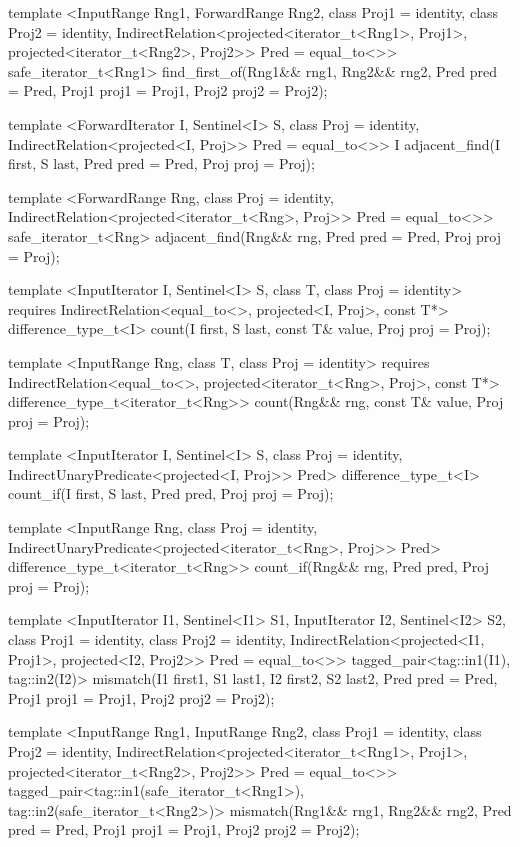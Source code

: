 {\begin{codeblock}
{{    template <InputRange Rng1, ForwardRange Rng2, class Proj1 = identity,
        class Proj2 = identity,
        IndirectRelation<projected<iterator_t<Rng1>, Proj1>,
          projected<iterator_t<Rng2>, Proj2>> Pred = equal_to<>>
      safe_iterator_t<Rng1>
        find_first_of(Rng1&& rng1, Rng2&& rng2,
                      Pred pred = Pred{},
                      Proj1 proj1 = Proj1{}, Proj2 proj2 = Proj2{});

    template <ForwardIterator I, Sentinel<I> S, class Proj = identity,
        IndirectRelation<projected<I, Proj>> Pred = equal_to<>>
      I adjacent_find(I first, S last, Pred pred = Pred{},
                      Proj proj = Proj{});

    template <ForwardRange Rng, class Proj = identity,
        IndirectRelation<projected<iterator_t<Rng>, Proj>> Pred = equal_to<>>
      safe_iterator_t<Rng>
        adjacent_find(Rng&& rng, Pred pred = Pred{}, Proj proj = Proj{});

    template <InputIterator I, Sentinel<I> S, class T, class Proj = identity>
      requires IndirectRelation<equal_to<>, projected<I, Proj>, const T*>
      difference_type_t<I>
        count(I first, S last, const T& value, Proj proj = Proj{});

    template <InputRange Rng, class T, class Proj = identity>
      requires IndirectRelation<equal_to<>, projected<iterator_t<Rng>, Proj>, const T*>
      difference_type_t<iterator_t<Rng>>
        count(Rng&& rng, const T& value, Proj proj = Proj{});

    template <InputIterator I, Sentinel<I> S, class Proj = identity,
        IndirectUnaryPredicate<projected<I, Proj>> Pred>
      difference_type_t<I>
        count_if(I first, S last, Pred pred, Proj proj = Proj{});

    template <InputRange Rng, class Proj = identity,
        IndirectUnaryPredicate<projected<iterator_t<Rng>, Proj>> Pred>
      difference_type_t<iterator_t<Rng>>
        count_if(Rng&& rng, Pred pred, Proj proj = Proj{});

    template <InputIterator I1, Sentinel<I1> S1, InputIterator I2, Sentinel<I2> S2,
        class Proj1 = identity, class Proj2 = identity,
        IndirectRelation<projected<I1, Proj1>, projected<I2, Proj2>> Pred = equal_to<>>
      tagged_pair<tag::in1(I1), tag::in2(I2)>
        mismatch(I1 first1, S1 last1, I2 first2, S2 last2, Pred pred = Pred{},
                Proj1 proj1 = Proj1{}, Proj2 proj2 = Proj2{});

    template <InputRange Rng1, InputRange Rng2,
        class Proj1 = identity, class Proj2 = identity,
        IndirectRelation<projected<iterator_t<Rng1>, Proj1>,
          projected<iterator_t<Rng2>, Proj2>> Pred = equal_to<>>
      tagged_pair<tag::in1(safe_iterator_t<Rng1>),
                  tag::in2(safe_iterator_t<Rng2>)>
        mismatch(Rng1&& rng1, Rng2&& rng2, Pred pred = Pred{},
                Proj1 proj1 = Proj1{}, Proj2 proj2 = Proj2{});

}}
\end{codeblock}}
